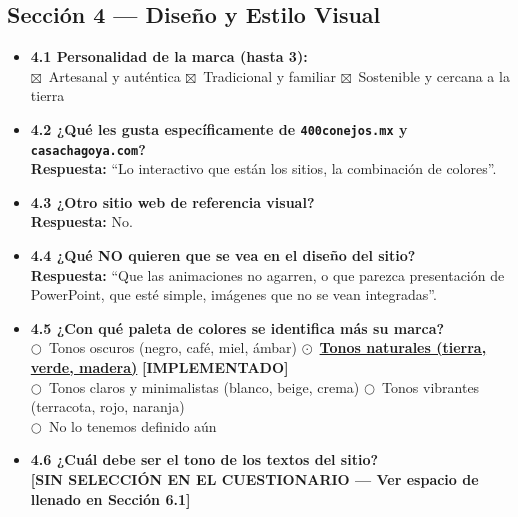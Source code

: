 \documentclass[11pt,letterpaper]{article}
\newcommand{\chk}{\textcolor{mezcalAgave}{$\boxtimes$}}
\newcommand{\uradio}{$\bigcirc$}
\newcommand{\radio}{\textcolor{mezcalAgave}{\textbf{$\odot$}}}
\begin{document}
\subsection{Sección 4 — Diseño y Estilo Visual}
\begin{itemize}[leftmargin=1.5em]
    \item \textbf{4.1 Personalidad de la marca (hasta 3):}\\
    \chk\ Artesanal y auténtica \quad
    \chk\ Tradicional y familiar \quad
    \chk\ Sostenible y cercana a la tierra

    \item \textbf{4.2 ¿Qué les gusta específicamente de \texttt{400conejos.mx} y \texttt{casachagoya.com}?}\\
    \textbf{Respuesta:} ``Lo interactivo que están los sitios, la combinación de colores''.

    \item \textbf{4.3 ¿Otro sitio web de referencia visual?}\\
    \textbf{Respuesta:} No.

    \item \textbf{4.4 ¿Qué NO quieren que se vea en el diseño del sitio?}\\
    \textbf{Respuesta:} ``Que las animaciones no agarren, o que parezca presentación de PowerPoint, que esté simple, imágenes que no se vean integradas''.

    \item \textbf{4.5 ¿Con qué paleta de colores se identifica más su marca?}\\
    \uradio\ Tonos oscuros (negro, café, miel, ámbar) \qquad
    \radio\ \underline{\textbf{Tonos naturales (tierra, verde, madera)}} \quad \textcolor{mezcalAgave}{\textbf{[IMPLEMENTADO]}}\\
    \uradio\ Tonos claros y minimalistas (blanco, beige, crema) \qquad
    \uradio\ Tonos vibrantes (terracota, rojo, naranja)\\
    \uradio\ No lo tenemos definido aún

    \item \textbf{4.6 ¿Cuál debe ser el tono de los textos del sitio?}\\
    \textcolor{red!80!black}{\textbf{[SIN SELECCIÓN EN EL CUESTIONARIO — Ver espacio de llenado en Sección 6.1]}}
\end{itemize}
\end{document}
